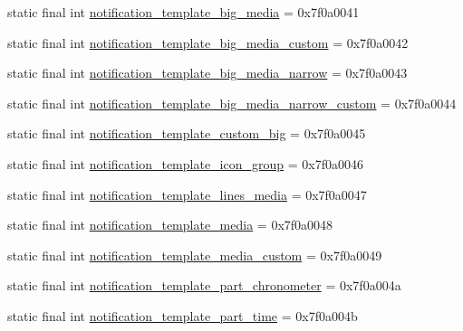 \begin{DoxyCompactItemize}
\item 
static final int \mbox{\hyperlink{classandroid_1_1support_1_1v7_1_1appcompat_1_1R_1_1layout_abc3d68ba9164e5339eb30ac8d1fcc032}{notification\+\_\+template\+\_\+big\+\_\+media}} = 0x7f0a0041
\item 
static final int \mbox{\hyperlink{classandroid_1_1support_1_1v7_1_1appcompat_1_1R_1_1layout_aee288f94dc9ffd3ce7466d8d50116b57}{notification\+\_\+template\+\_\+big\+\_\+media\+\_\+custom}} = 0x7f0a0042
\item 
static final int \mbox{\hyperlink{classandroid_1_1support_1_1v7_1_1appcompat_1_1R_1_1layout_adb6b83ae65b94247d0c806e75af83190}{notification\+\_\+template\+\_\+big\+\_\+media\+\_\+narrow}} = 0x7f0a0043
\item 
static final int \mbox{\hyperlink{classandroid_1_1support_1_1v7_1_1appcompat_1_1R_1_1layout_a5f3ed04cc1131d91543d23e5a5e2e101}{notification\+\_\+template\+\_\+big\+\_\+media\+\_\+narrow\+\_\+custom}} = 0x7f0a0044
\item 
static final int \mbox{\hyperlink{classandroid_1_1support_1_1v7_1_1appcompat_1_1R_1_1layout_a3207d2343821a6e1822345fbff858699}{notification\+\_\+template\+\_\+custom\+\_\+big}} = 0x7f0a0045
\item 
static final int \mbox{\hyperlink{classandroid_1_1support_1_1v7_1_1appcompat_1_1R_1_1layout_ab83401c918fc5f08cbb6820f8587ae41}{notification\+\_\+template\+\_\+icon\+\_\+group}} = 0x7f0a0046
\item 
static final int \mbox{\hyperlink{classandroid_1_1support_1_1v7_1_1appcompat_1_1R_1_1layout_a5260a3897e877a0f8d44b1d75eed177d}{notification\+\_\+template\+\_\+lines\+\_\+media}} = 0x7f0a0047
\item 
static final int \mbox{\hyperlink{classandroid_1_1support_1_1v7_1_1appcompat_1_1R_1_1layout_a61744f22e936099b070df0771b4b1fee}{notification\+\_\+template\+\_\+media}} = 0x7f0a0048
\item 
static final int \mbox{\hyperlink{classandroid_1_1support_1_1v7_1_1appcompat_1_1R_1_1layout_a37998a101ae0ec5563c2b0428cda074f}{notification\+\_\+template\+\_\+media\+\_\+custom}} = 0x7f0a0049
\item 
static final int \mbox{\hyperlink{classandroid_1_1support_1_1v7_1_1appcompat_1_1R_1_1layout_a40ec1f0c58d5ef14dcdabd2917b39098}{notification\+\_\+template\+\_\+part\+\_\+chronometer}} = 0x7f0a004a
\item 
static final int \mbox{\hyperlink{classandroid_1_1support_1_1v7_1_1appcompat_1_1R_1_1layout_a45b077fa0a865191a582090d784b1163}{notification\+\_\+template\+\_\+part\+\_\+time}} = 0x7f0a004b

\end{DoxyCompactItemize}

